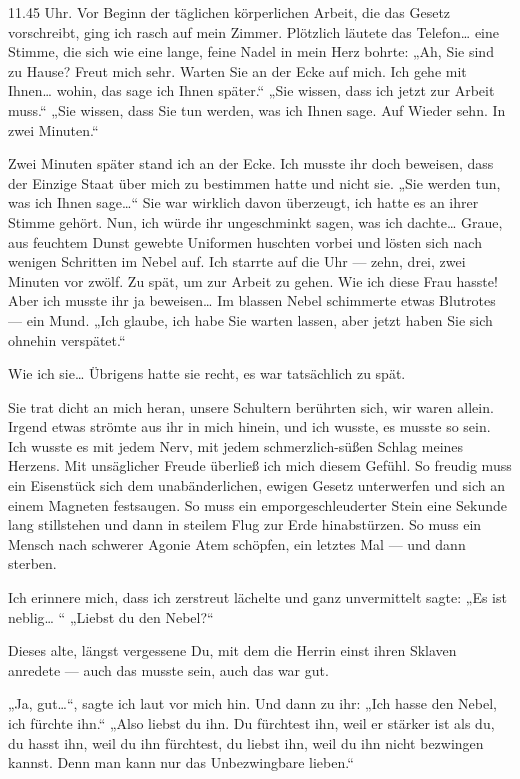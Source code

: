 11.45 Uhr. Vor Beginn der täglichen körperlichen Arbeit, die das
Gesetz vorschreibt, ging ich rasch auf mein Zimmer. Plötzlich
läutete das Telefon\ldots{} eine Stimme, die sich wie eine lange, feine
Nadel in mein Herz bohrte: „Ah, Sie sind zu Hause? Freut mich sehr.
Warten Sie an der Ecke auf mich. Ich gehe mit Ihnen\ldots{} wohin, das
sage ich Ihnen später.“ „Sie wissen, dass ich jetzt zur Arbeit
muss.“ „Sie wissen, dass Sie tun werden, was ich Ihnen sage. Auf
Wieder sehn. In zwei Minuten.“

Zwei Minuten später stand ich an der Ecke. Ich musste ihr doch
beweisen, dass der Einzige Staat über mich zu bestimmen hatte und
nicht sie. „Sie werden tun, was ich Ihnen sage\ldots{}“ Sie war wirklich
davon überzeugt, ich hatte es an ihrer Stimme gehört. Nun, ich
würde ihr ungeschminkt sagen, was ich dachte\ldots{} Graue, aus feuchtem
Dunst gewebte Uniformen huschten vorbei und lösten sich nach
wenigen Schritten im Nebel auf. Ich starrte auf die Uhr — zehn,
drei, zwei Minuten vor zwölf. Zu spät, um zur Arbeit zu gehen. Wie
ich diese Frau hasste! Aber ich musste ihr ja beweisen\ldots{} Im
blassen Nebel schimmerte etwas Blutrotes — ein Mund. „Ich glaube,
ich habe Sie warten lassen, aber jetzt haben Sie sich ohnehin
verspätet.“

Wie ich sie\ldots{} Übrigens hatte sie recht, es war tatsächlich zu
spät.

Sie trat dicht an mich heran, unsere Schultern berührten sich, wir
waren allein. Irgend etwas strömte aus ihr in mich hinein, und ich
wusste, es musste so sein. Ich wusste es mit jedem Nerv, mit jedem
schmerzlich-süßen Schlag meines Herzens. Mit unsäglicher Freude
überließ ich mich diesem Gefühl. So freudig muss ein Eisenstück
sich dem unabänderlichen, ewigen Gesetz unterwerfen und sich an
einem Magneten festsaugen. So muss ein emporgeschleuderter Stein
eine Sekunde lang stillstehen und dann in steilem Flug zur Erde
hinabstürzen. So muss ein Mensch nach schwerer Agonie Atem
schöpfen, ein letztes Mal — und dann sterben.

Ich erinnere mich, dass ich zerstreut lächelte und ganz
unvermittelt sagte: „Es ist neblig\ldots{} “ „Liebst du den Nebel?“

Dieses alte, längst vergessene Du, mit dem die Herrin einst ihren
Sklaven anredete — auch das musste sein, auch das war gut.

„Ja, gut\ldots{}“, sagte ich laut vor mich hin. Und dann zu ihr: „Ich
hasse den Nebel, ich fürchte ihn.“ „Also liebst du ihn. Du
fürchtest ihn, weil er stärker ist als du, du hasst ihn, weil du
ihn fürchtest, du liebst ihn, weil du ihn nicht bezwingen kannst.
Denn man kann nur das Unbezwingbare lieben.“

